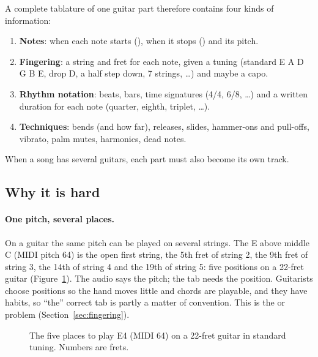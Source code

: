 A complete tablature of one guitar part therefore contains four kinds of
information:
\begin{enumerate}
\item \textbf{Notes}: when each note starts (), when it stops
  () and its pitch.
\item \textbf{Fingering}: a string and fret for each note, given a tuning
  (standard E A D G B E, drop D, a half step down, 7 strings, \ldots) and maybe
  a capo.
\item \textbf{Rhythm notation}: beats, bars, time signatures (4/4, 6/8, \ldots)
  and a written duration for each note (quarter, eighth, triplet, \ldots).
\item \textbf{Techniques}: bends (and how far), releases, slides, hammer-ons
  and pull-offs, vibrato, palm mutes, harmonics, dead notes.
\end{enumerate}
When a song has several guitars, each part must also become its own track.

\subsection{Why it is hard}

\paragraph{One pitch, several places.} On a guitar the same pitch can be played
on several strings. The E above middle C (MIDI pitch 64) is the open first
string, the 5th fret of string 2, the 9th fret of string 3, the 14th of string 4
and the 19th of string 5: five positions on a 22-fret guitar
(Figure~\ref{fig:positions}). The audio says the pitch; the tab needs the
position. Guitarists choose positions so the hand moves little and chords are
playable, and they have habits, so ``the'' correct tab is partly a matter of
convention. This is the  or 
problem (Section~\ref{sec:fingering}).

\begin{figure}[h]
\centering
{}
\caption{The five places to play E4 (MIDI 64) on a 22-fret guitar in standard
tuning. Numbers are frets.}
\label{fig:positions}
\end{figure}

